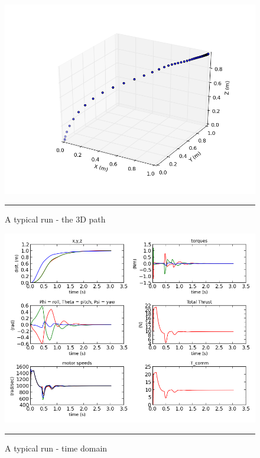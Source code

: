\begin{figure}[htbp]
	\centering
		\includegraphics[width=\textwidth]{Figures/typical_run_time_3D_path.png}
		\rule{35em}{0.5pt}
	\caption[Typical Run 3D Path]{A typical run - the 3D path}
	\label{fig:Typical Run 3D Path}
\end{figure}

\begin{figure}[htbp]
	\centering
		\includegraphics[width=\textwidth]{Figures/typical_run_time_domain.png}
		\rule{35em}{0.5pt}
	\caption[Typical Run Time Domain]{A typical run - time domain}
	\label{fig:Typical Run Time Domain}
\end{figure}


